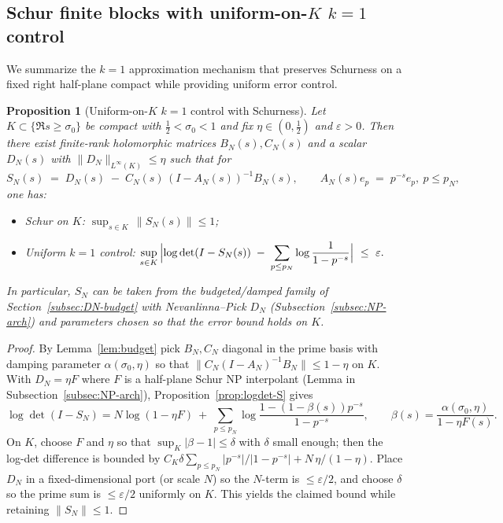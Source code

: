 \documentclass[11pt]{article}
\newtheorem{proposition}[theorem]{Proposition}
\theoremstyle{definition}
\theoremstyle{remark}
\begin{document}
\subsection{Schur finite blocks with uniform-on-$K$ $k=1$ control}\label{subsec:K1-approx}
We summarize the $k=1$ approximation mechanism that preserves Schurness on a fixed right half-plane compact while providing uniform error control.

\begin{proposition}[Uniform-on-$K$ $k=1$ control with Schurness]\label{prop:K1-approx}
Let $K\subset\{\Re s\ge\sigma_0\}$ be compact with $\tfrac12<\sigma_0<1$ and fix $\eta\in(0,\tfrac12)$ and $\varepsilon>0$. Then there exist finite-rank holomorphic matrices $B_N(s),C_N(s)$ and a scalar $D_N(s)$ with $\|D_N\|_{L^{\infty}(K)}\le\eta$ such that for
\[
 S_N(s)\;=\;D_N(s)\; -\; C_N(s)\,(I-A_N(s))^{-1}B_N(s),\qquad A_N(s)e_p\;=\;p^{-s}e_p,\ p\le p_N,
\]
one has:
\begin{itemize}
 \item Schur on $K$: $\displaystyle\sup_{s\in K}\,\|S_N(s)\|\le 1$;
 \item Uniform $k=1$ control: $\displaystyle\sup_{s\in K}\,\Bigl|\log\det(I-S_N(s))\; -\;\sum_{p\le p_N}\log\frac{1}{1-p^{-s}}\Bigr|\ \le\ \varepsilon.$
\end{itemize}
In particular, $S_N$ can be taken from the budgeted/damped family of Section~\ref{subsec:DN-budget} with Nevanlinna--Pick $D_N$ (Subsection~\ref{subsec:NP-arch}) and parameters chosen so that the error bound holds on $K$.
\end{proposition}
\begin{proof}
By Lemma~\ref{lem:budget} pick $B_N,C_N$ diagonal in the prime basis with damping parameter $\alpha(\sigma_0,\eta)$ so that $\|C_N(I-A_N)^{-1}B_N\|\le 1-\eta$ on $K$. With $D_N=\eta F$ where $F$ is a half-plane Schur NP interpolant (Lemma in Subsection~\ref{subsec:NP-arch}), Proposition~\ref{prop:logdet-S} gives
\[
 \log\det(I-S_N)=N\log(1-\eta F)\ +\ \sum_{p\le p_N}\log\frac{1-(1-\beta(s))p^{-s}}{1-p^{-s}},\qquad \beta(s)=\frac{\alpha(\sigma_0,\eta)}{1-\eta F(s)}.
\]
On $K$, choose $F$ and $\eta$ so that $\sup_K|\beta-1|\le\delta$ with $\delta$ small enough; then the log-det difference is bounded by $C_K\delta\sum_{p\le p_N}|p^{-s}|/|1-p^{-s}|+N\,\eta/(1-\eta)$. Place $D_N$ in a fixed-dimensional port (or scale $N$) so the $N$-term is $\le \varepsilon/2$, and choose $\delta$ so the prime sum is $\le\varepsilon/2$ uniformly on $K$. This yields the claimed bound while retaining $\|S_N\|\le 1$.
\end{proof}
\end{document}
